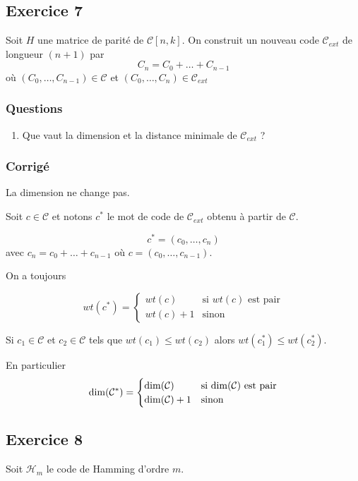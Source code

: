 \documentclass[a4paper,10pt,twocolumn]{article}
\theoremstyle{break}
\newcommand{\code}[1]{\mathcal{#1}}
\newcommand{\C}{\code{C}}
\begin{document}
\subsection*{Exercice 7}
Soit $H$ une matrice de parité de $\C[n,k]$. On construit un nouveau code $\C_{ext}$ de longueur $(n+1)$ par 
$$C_n = C_0 + \ldots + C_{n-1}$$
où $(C_0, \ldots, C_{n-1}) \in \C$ et $(C_0, \ldots, C_{n}) \in \C_{ext}$

\subsubsection*{Questions}
\begin{enumerate}
 \item Que vaut la dimension et la distance minimale de $\C_{ext}$ ?
\end{enumerate}

\subsubsection*{Corrigé}

La dimension ne change pas.

Soit $c\in\C$ et notons $c^*$ le mot de code de $\C_{ext}$ obtenu à partir de $\C$.

$$ c^* = (c_0, \ldots, c_n) $$
avec $c_n = c_0 + \ldots + c_{n-1}$ où $c = (c_0, \ldots, c_{n-1})$.

On a toujours

$$ wt(c^*) = \begin{cases}
              wt(c) & \text{si $wt(c)$ est pair}\\
              wt(c)+1 & \text{sinon}
             \end{cases} $$

Si $c_1 \in \C$ et $c_2 \in \C$ tels que $wt(c_1) \le wt(c_2)$ alors $wt(c_1^*) \le wt(c_2^*)$.

En particulier
$$ {\rm dim}(\C^*) = \begin{cases}
                     {\rm dim}(\C) & \text{si ${\rm dim}(\C)$ est pair}\\
                     {\rm dim}(\C)+1 & \text{sinon}
                    \end{cases} $$

\subsection*{Exercice 8}
Soit $\code{H}_m$ le code de Hamming d'ordre $m$.
\end{document}
